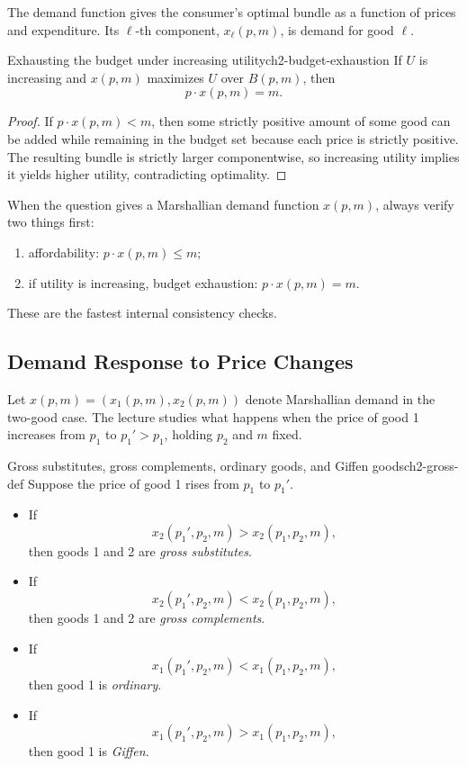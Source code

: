 The demand function gives the consumer's optimal bundle as a function of prices and expenditure. Its $\ell$-th component, $x_\ell(p,m)$, is demand for good $\ell$.

\begin{theorem}{Exhausting the budget under increasing utility}{ch2-budget-exhaustion}
If $U$ is increasing and $x(p,m)$ maximizes $U$ over $B(p,m)$, then
\[
p \cdot x(p,m)=m.
\]
\end{theorem}

\begin{proof}
If $p \cdot x(p,m) < m$, then some strictly positive amount of some good can be added while remaining in the budget set because each price is strictly positive. The resulting bundle is strictly larger componentwise, so increasing utility implies it yields higher utility, contradicting optimality.
\end{proof}

\begin{examtip}
When the question gives a Marshallian demand function $x(p,m)$, always verify two things first:
\begin{enumerate}
    \item affordability: $p \cdot x(p,m) \le m$;
    \item if utility is increasing, budget exhaustion: $p \cdot x(p,m)=m$.
\end{enumerate}
These are the fastest internal consistency checks.
\end{examtip}

\subsection{Demand Response to Price Changes}

Let $x(p,m)=(x_1(p,m),x_2(p,m))$ denote Marshallian demand in the two-good case. The lecture studies what happens when the price of good 1 increases from $p_1$ to $p_1' > p_1$, holding $p_2$ and $m$ fixed.

\begin{definition}{Gross substitutes, gross complements, ordinary goods, and Giffen goods}{ch2-gross-def}
Suppose the price of good 1 rises from $p_1$ to $p_1'$.

\begin{itemize}
    \item If
    \[
    x_2(p_1',p_2,m) > x_2(p_1,p_2,m),
    \]
    then goods 1 and 2 are \emph{gross substitutes}.
    \item If
    \[
    x_2(p_1',p_2,m) < x_2(p_1,p_2,m),
    \]
    then goods 1 and 2 are \emph{gross complements}.
    \item If
    \[
    x_1(p_1',p_2,m) < x_1(p_1,p_2,m),
    \]
    then good 1 is \emph{ordinary}.
    \item If
    \[
    x_1(p_1',p_2,m) > x_1(p_1,p_2,m),
    \]
    then good 1 is \emph{Giffen}.
\end{itemize}
\end{definition}

